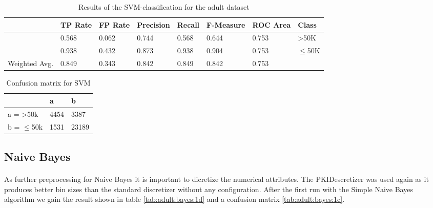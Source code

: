 \documentclass[paper=a4, fontsize=11pt]{scrartcl} %
\numberwithin{equation}{section} %
\numberwithin{figure}{section} %
\numberwithin{table}{section} %
\begin{document}
\begin{table}[h]
\centering
\begin{tabular}{|llllllll|}
	\hline
									&TP Rate   	&FP Rate   &Precision   &Recall  &F-Measure &ROC Area  	&Class\\
	\hline
									&0.568     	&0.062     &0.744     	&0.568   &0.644    	&0.753    	&	>50K\\
  								&0.938     	&0.432     &0.873     	&0.938   &0.904     &0.753    	&$\leq$50K\\
  \hline
	Weighted Avg.   & 0.849    & 0.343     &0.842   		&0.849   &0.842     & 0.753			&\\
	\hline
\end{tabular}
\caption{Results of the SVM-classification for the adult dataset}
\end{table}

\vspace{6pt}

\begin{table}[h]
\centering
\begin{tabular}{|l|ll|}
\hline
              &    a &     b \\
\hline
 a = >50k      & 4454 &  3387 \\
 b = $\leq$50k & 1531 & 23189\\
\hline
\end{tabular}
\caption{Confusion matrix for SVM}
\end{table}


\subsection{Naive Bayes}

\paragraph{}As further preprocessing for Naive Bayes it is important to dicretize the numerical attributes. The PKIDescretizer was used again as it produces better bin sizes than the standard discretizer without any configuration. After the first run with the Simple Naive Bayes algorithm we gain the result shown in table \ref{tab:adult:bayes:1d} and a confusion matrix \ref{tab:adult:bayes:1c}.
\end{document}
